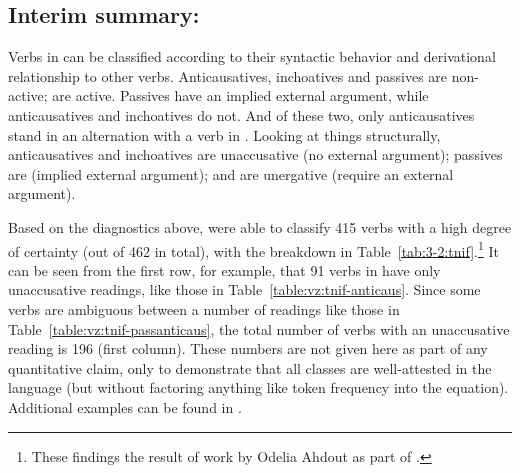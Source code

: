 \begin{exe}
\begin{xlist}
\begin{xlist}
\begin{exe}
\begin{xlist}
\begin{xlist}
\begin{exe}
\begin{xlist}
\begin{xlist}
\begin{exe}
\begin{exe}
\begin{xlist}
\begin{exe}
\begin{exe}
\begin{xlist}
\begin{exe}
\begin{exe}
\begin{exe}
\begin{exe}
\begin{exe}
\begin{xlist}
\begin{exe}
\begin{xlist}
\begin{exe}
\begin{exe}
\begin{xlist}
	\subsection{Interim summary: \tnif} \label{vz:tnif:sum}\largerpage
Verbs in {\tnif} can be classified according to their syntactic behavior and derivational relationship to other verbs. Anticausatives, inchoatives and passives are non-active;  are active. Passives have an implied external argument, while anticausatives and inchoatives do not. And of these two, only anticausatives stand in an alternation with a verb in {\tkal}. Looking at things structurally, anticausatives and inchoatives are unaccusative (no external argument); passives are  (implied external argument); and  are unergative (require an external argument).

Based on the diagnostics above, \cite{ahdoutkastner19nels} were able to classify 415 verbs with a high degree of certainty (out of 462 in total), with the breakdown in Table~\ref{tab:3-2:tnif}.\footnote{These findings the result of work by Odelia Ahdout as part of \citet{ahdout19phd}.} It can be seen from the first row, for example, that 91 verbs in {\tnif} have only unaccusative readings, like those in Table~\ref{table:vz:tnif-anticaus}. Since some verbs are ambiguous between a number of readings like those in Table~\ref{table:vz:tnif-passanticaus}, the total number of verbs with an unaccusative reading is 196 (first column). These numbers are not given here as part of any quantitative claim, only to demonstrate that all classes are well-attested in the language (but without factoring anything like token frequency into the equation). Additional examples can be found in \cite{ahdoutkastner19nels}.


\end{xlist}
\end{exe}
\end{exe}
\end{xlist}
\end{exe}
\end{xlist}
\end{exe}
\end{exe}
\end{exe}
\end{exe}
\end{exe}
\end{xlist}
\end{exe}
\end{exe}
\end{xlist}
\end{exe}
\end{exe}
\end{xlist}
\end{xlist}
\end{exe}
\end{xlist}
\end{xlist}
\end{exe}
\end{xlist}
\end{xlist}
\end{exe}
